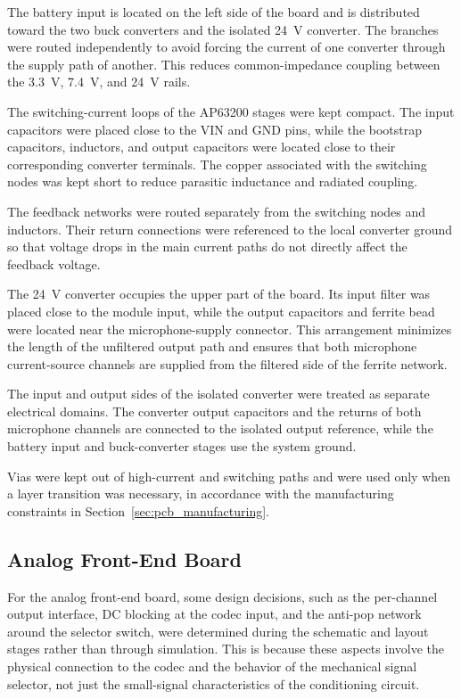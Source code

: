 The battery input is located on the left side of the board and is distributed toward the two buck converters and the isolated 24~V converter. The branches were routed independently to avoid forcing the current of one converter through the supply path of another. This reduces common-impedance coupling between the 3.3~V, 7.4~V, and 24~V rails.

The switching-current loops of the AP63200 stages were kept compact. The input capacitors were placed close to the VIN and GND pins, while the bootstrap capacitors, inductors, and output capacitors were located close to their corresponding converter terminals. The copper associated with the switching nodes was kept short to reduce parasitic inductance and radiated coupling.

The feedback networks were routed separately from the switching nodes and inductors. Their return connections were referenced to the local converter ground so that voltage drops in the main current paths do not directly affect the feedback voltage.

The 24~V converter occupies the upper part of the board. Its input filter was placed close to the module input, while the output capacitors and ferrite bead were located near the microphone-supply connector. This arrangement minimizes the length of the unfiltered output path and ensures that both microphone current-source channels are supplied from the filtered side of the ferrite network.

The input and output sides of the isolated converter were treated as separate electrical domains. The converter output capacitors and the returns of both microphone channels are connected to the isolated output reference, while the battery input and buck-converter stages use the system ground.

Vias were kept out of high-current and switching paths and were used only when a layer transition was necessary, in accordance with the manufacturing constraints in Section~\ref{sec:pcb_manufacturing}.

\subsection{Analog Front-End Board}
\label{sec:pcb_afe}

For the analog front-end board, some design decisions, such as the per-channel output interface, DC blocking at the codec input, and the anti-pop network around the selector switch, were determined during the schematic and layout stages rather than through simulation. This is because these aspects involve the physical connection to the codec and the behavior of the mechanical signal selector, not just the small-signal characteristics of the conditioning circuit.

